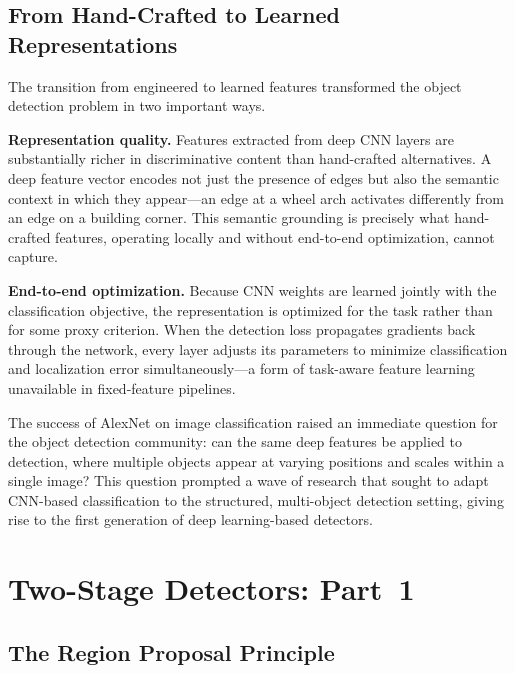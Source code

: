 \subsection{From Hand-Crafted to Learned Representations}

The transition from engineered to learned features transformed
the object detection problem in two important ways.

\textbf{Representation quality.} Features extracted from deep
CNN layers are substantially richer in discriminative content
than hand-crafted alternatives. A deep feature vector encodes
not just the presence of edges but also the semantic context
in which they appear---an edge at a wheel arch activates
differently from an edge on a building corner. This semantic
grounding is precisely what hand-crafted features, operating
locally and without end-to-end optimization, cannot capture.

\textbf{End-to-end optimization.} Because CNN weights are learned
jointly with the classification objective, the representation
is optimized for the task rather than for some proxy criterion.
When the detection loss propagates gradients back through the
network, every layer adjusts its parameters to minimize
classification and localization error simultaneously---a form
of task-aware feature learning unavailable in fixed-feature
pipelines.

The success of AlexNet on image classification raised an immediate
question for the object detection community: can the same deep
features be applied to detection, where multiple objects appear
at varying positions and scales within a single image? This
question prompted a wave of research that sought to adapt CNN-based
classification to the structured, multi-object detection setting,
giving rise to the first generation of deep learning-based
detectors.


\section{Two-Stage Detectors: Part~1}

\subsection{The Region Proposal Principle}

